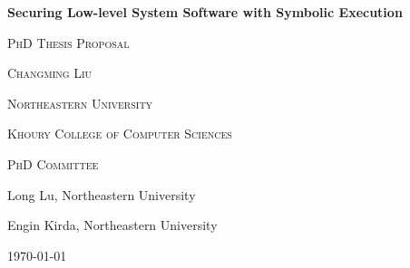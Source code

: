 \documentclass[8pt]{extarticle}
\begin{document}

\begin{titlepage}
    \centering

    {\bf\Huge Securing Low-level System Software with Symbolic Execution \par}
    \vspace{0.5cm}
    {\scshape\large PhD Thesis Proposal \par}

    \vspace{4cm}

    {\scshape\huge Changming Liu \par}
    \vspace{0.5cm}
    {\scshape\large Northeastern University \par}
    {\scshape\large Khoury College of Computer Sciences \par}

    \vspace{4cm}

    {\scshape\large PhD Committee \par}
    \vspace{0.5cm}
    {\large Long Lu, Northeastern University\par}
    {\large Engin Kirda, Northeastern University\par}

    \vfill

    {\large \today\par}
\end{titlepage}


\restoregeometry
\pagebreak

\tableofcontents
\pagebreak








\pagebreak

\footnotesize


\end{document}

